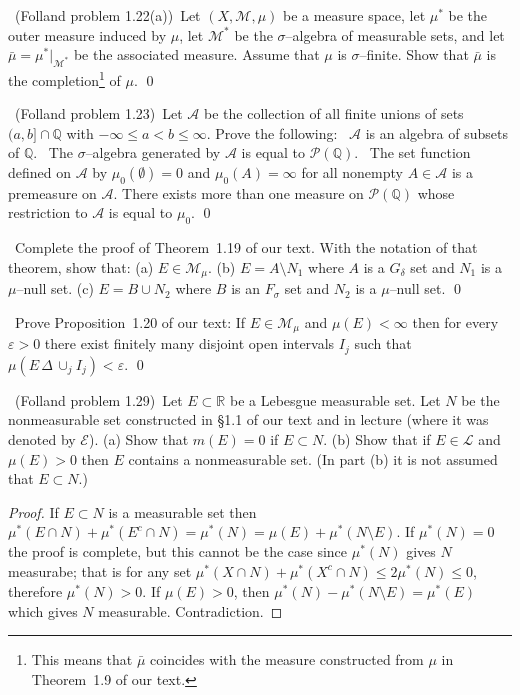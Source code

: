 \documentclass[11pt]{amsart}
\theoremstyle{definition}
\numberwithin{theorem}{section}
\numberwithin{definition}{section}
\numberwithin{equation}{section}
\def\reals{{\mathbb R}}
\def\rationals{{\mathbb Q}}
\def\eps{\varepsilon}
\def\scriptm{{\mathcal M}}
\def\scripte{{\mathcal E}}
\def\scripta{{\mathcal A}}
\def\scriptl{{\mathcal L}}
\def\scriptp{{\mathcal P}}
\def\symdif{\,\Delta\,}
\def\mustar{\mu^*}
\begin{document}
\medskip {}\ 
(Folland problem 1.22(a))\ 
Let $(X,\scriptm,\mu)$ be a measure space, let $\mustar$ be the outer measure induced
by $\mu$, let $\scriptm^*$ be the $\sigma$--algebra of measurable sets, 
and let $\bar\mu=\mustar|_{\scriptm^*}$ be the associated measure.
Assume that $\mu$ is $\sigma$--finite. Show that $\bar\mu$ is the completion\footnote{This means
that $\bar\mu$ coincides with the measure constructed from $\mu$ in Theorem~1.9 of our text.} of $\mu$. 
\qed

\medskip {}\ 
(Folland problem 1.23)\ 
Let $\scripta$ be the collection of all finite unions of sets $(a,b]\cap\rationals$
with $-\infty\le a<b\le\infty$. Prove the following:
\newline {\bf (a)}\
$\scripta$ is an algebra of subsets of $\rationals$.
\newline {\bf (b)}\
The $\sigma$--algebra generated by $\scripta$ is equal to $\scriptp(\rationals)$.
\newline {\bf (c)}\
The set function defined on $\scripta$ by $\mu_0(\emptyset)=0$
and $\mu_0(A)=\infty$ for all nonempty $A\in\scripta$ is a premeasure on $\scripta$.
There exists more than one measure on $\scriptp(\rationals)$ whose restriction to
$\scripta$ is equal to $\mu_0$.
\qed

\medskip {}\ 
Complete the proof of Theorem~1.19 of our text. With the notation of that theorem, show that:
(a) $E\in\scriptm_\mu$. (b) $E = A\setminus N_1$ where $A$ is a $G_\delta$
set and $N_1$ is a $\mu$--null set.  (c) $E = B\cup N_2$ where $B$ is an $F_\sigma$
set and $N_2$ is a $\mu$--null set.
\qed

\medskip {}\ 
Prove Proposition~1.20 of our text:
If $E\in\scriptm_\mu$ and $\mu(E)<\infty$ then for every $\eps>0$
there exist finitely many disjoint open intervals $I_j$ such that
$\mu(E\symdif \cup_j I_j)<\eps$.
\qed

\medskip {}\ 
(Folland problem 1.29)\ 
Let $E\subset\reals$ be a Lebesgue measurable set. 
Let $N$ be the nonmeasurable set constructed in \S1.1 of our text and in
lecture (where it was denoted by $\scripte$). 
(a) Show that $m(E)=0$ if $E\subset N$.
(b) Show that if $E\in\scriptl$ and $\mu(E)>0$ then $E$ contains a nonmeasurable set.
(In part (b) it is not assumed that $E\subset N$.)
\begin{proof}
If $E \subset N$ is a measurable set then $\mu^*(E \cap N) + \mu^*(E^c \cap N) = \mu^*(N) = \mu(E) + \mu^*(N \setminus E).$ If $\mu^*(N) = 0$ the proof is complete, but this cannot be the case since $\mu^*(N)$ gives $N$ measurabe; that is for any set $\mu^*(X \cap N) + \mu^*(X^c \cap N) \leq 2\mu^*(N) \leq 0$, therefore $\mu^*(N) > 0$. If $\mu(E) > 0$, then $\mu^*(N) - \mu^*(N \setminus E) = \mu^*(E)$ which gives $N$ measurable. Contradiction. 
\end{proof}
\end{document}
